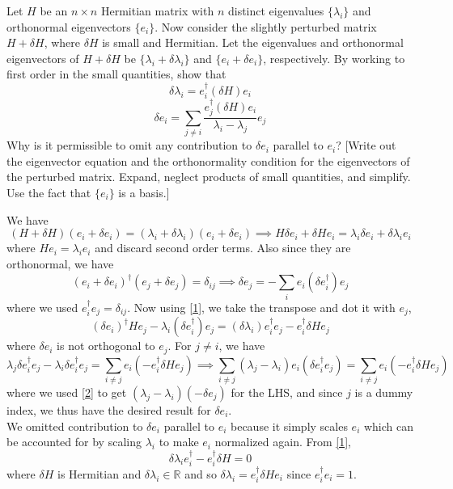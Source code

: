 \documentclass[a4paper]{article}
\begin{document}
\begin{qns}
Let $H$ be an $n\times n$ Hermitian matrix with $n$ distinct eigenvalues $\{\lambda_i\}$ and orthonormal eigenvectors $\{e_i\}$. Now consider the slightly perturbed matrix $H+\delta H$, where $\delta H$ is small and Hermitian. Let the eigenvalues and orthonormal eigenvectors of $H+\delta H$ be $\{\lambda_i+\delta\lambda_i\}$ and $\{e_i+\delta e_i\}$, respectively. By working to first order in the small quantities, show that
$$\delta\lambda_i=e_i^\dag (\delta H)e_i$$
$$\delta e_i=\sum_{j\neq i}\frac{e_j^\dag(\delta H)e_i}{\lambda_i-\lambda_j}e_j$$
Why is it permissible to omit any contribution to $\delta e_i$ parallel to $e_i$? [Write out the eigenvector equation and the orthonormality condition for the eigenvectors of the perturbed matrix. Expand, neglect products of small quantities, and simplify. Use
the fact that $\{e_i\}$ is a basis.]
\end{qns}
\begin{ans}
We have
\begin{equation}\label{1}
(H+\delta H)(e_i+\delta e_i)=(\lambda_i+\delta\lambda_i)(e_i+\delta e_i)\implies H\delta e_i+\delta He_i=\lambda_i\delta e_i+\delta\lambda_ie_i\tag{1}
\end{equation}
where $He_i=\lambda_ie_i$ and discard second order terms. Also since they are orthonormal, we have 
\begin{equation}\label{2}
(e_i+\delta e_i)^\dag(e_j+\delta e_j)=\delta_{ij}\implies\delta e_j=-\sum_ie_i(\delta e_i^\dag)e_j\tag{2}
\end{equation}
where we used $e_i^\dag e_j=\delta_{ij}$. Now using \ref{1}, we take the transpose and dot it with $e_j$,
$$(\delta e_i)^\dag He_j-\lambda_i(\delta e_i^\dag)e_j=(\delta\lambda_i)e_i^\dag e_j-e_i^\dag\delta He_j$$
where $\delta e_i$ is not orthogonal to $e_j$. For $j\neq i$, we have
$$\lambda_j\delta e_i^\dag e_j-\lambda_i\delta e_i^\dag e_j=\sum_{i\neq j}e_i(-e_i^\dag\delta H e_j)\implies \sum_{i\neq j}(\lambda_j-\lambda_i)e_i(\delta e_i^\dag e_j)=\sum_{i\neq j}e_i(-e_i^\dag\delta H e_j)$$
where we used \ref{2} to get $(\lambda_j-\lambda_i)(-\delta e_j)$ for the LHS, and since $j$ is a dummy index, we thus have the desired result for $\delta e_i$.\\[5pt]
We omitted contribution to $\delta e_i$ parallel to $e_i$ because it simply scales $e_i$ which can be accounted for by scaling $\lambda_i$ to make $e_i$ normalized again. From \ref{1},
$$\delta\lambda_i e_i^\dag-e_i^\dag\delta H=0$$
where $\delta H$ is Hermitian and $\delta\lambda_i\in\mathbb{R}$ and so $\delta\lambda_i=e_i^\dag\delta He_i$ since $e_i^\dag e_i=1$.
\end{ans}
\end{document}

